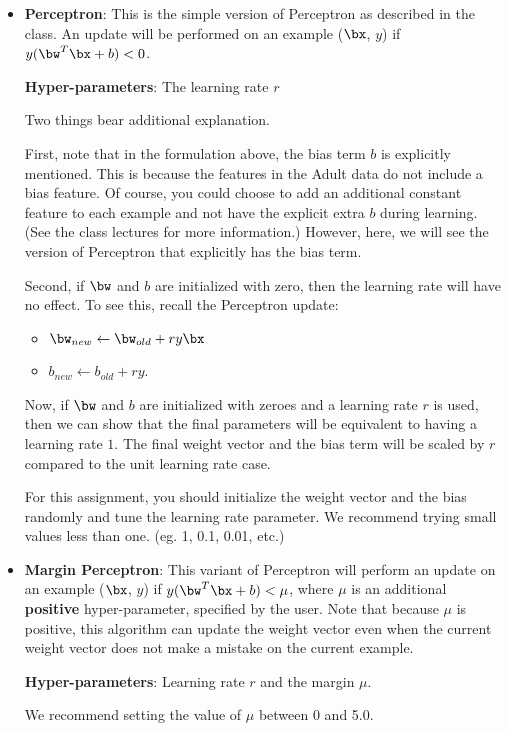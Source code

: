 \begin{itemize}
\item {\bf Perceptron}: This is the simple version of Perceptron as
  described in the class. An update will be performed on an example
  ($\bx$, $y$) if $y (\bw^T\bx + b) < 0$.
  
  {\bf Hyper-parameters}: The learning rate $r$

  Two things bear additional explanation. 

  First, note that in the formulation above, the bias term $b$ is
  explicitly mentioned. This is because the features in the Adult data
  do not include a bias feature. Of course, you could choose to add an
  additional constant feature to each example and not have the
  explicit extra $b$ during learning. (See the class lectures for more
  information.) However, here, we will see the version of Perceptron
  that explicitly has the bias term.

  Second, if $\bw$ and $b$ are initialized with zero, then the
  learning rate will have no effect. To see this, recall the
  Perceptron update: 

  \begin{itemize}
  \item[] $\bw_{new} \leftarrow \bw_{old} + r y \bx$
  \item[] $b_{new} \leftarrow b_{old} + r y$.
  \end{itemize}

  Now, if $\bw$ and $b$ are initialized with zeroes and a learning
  rate $r$ is used, then we can show that the final parameters will be
  equivalent to having a learning rate $1$. The final weight vector
  and the bias term will be scaled by $r$ compared to the unit
  learning rate case.

  For this assignment, you should initialize the weight vector and the
  bias randomly and tune the learning rate parameter. We recommend
  trying small values less than one. (eg. 1, 0.1, 0.01, etc.)

\item {\bf Margin Perceptron}: This variant of Perceptron will perform
  an update on an example ($\bx$, $y$) if $y (\bw^T\bx + b) < \mu$,
  where $\mu$ is an additional {\bf positive} hyper-parameter,
  specified by the user. Note that because $\mu$ is positive, this
  algorithm can update the weight vector even when the current weight
  vector does not make a mistake on the current example.

  {\bf Hyper-parameters}: Learning rate $r$ and the margin $\mu$. 

  We recommend setting the value of $\mu$ between 0 and 5.0.
  
\end{itemize}

